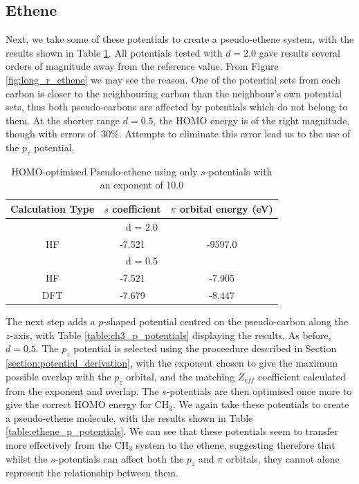 \documentclass[journal=jctcce,manuscript=article]{achemso}
\begin{document}
\subsection{Ethene}

Next, we take some of these potentials to create a pseudo-ethene system, with the results shown in Table \ref{table:ethene_s_pseudo}. All potentials tested with \(d = 2.0\) gave results several orders of magnitude away from the reference value. From Figure \ref{fig:long_r_ethene} we may see the reason. One of the potential sets from each carbon is closer to the neighbouring carbon than the neighbour's own potential sets, thus both pseudo-carbons are affected by potentials which do not belong to them. At the shorter range \(d = 0.5\), the HOMO energy is of the right magnitude, though with errors of \(~ 30\%\). Attempts to eliminate this error lead us to the use of the \(p_{z}\) potential. 

\begin{table}[ht]
\caption{HOMO-optimised Pseudo-ethene using only \(s\)-potentials with an exponent of 10.0}

\begin{tabular}{c c c}
\hline\hline
Calculation Type & \(s\) coefficient & \( \pi \) orbital energy (eV) \\
\hline
\multicolumn{3}{c}{d = 2.0} \\
\hline
HF & -7.521 & -9597.0 \\
\hline
\multicolumn{3}{c}{d = 0.5} \\
\hline
HF & -7.521 & -7.905 \\
DFT & -7.679 & -8.447 \\
\hline
\end{tabular}
\label{table:ethene_s_pseudo}
\end{table}

The next step adds a \(p\)-shaped potential centred on the pseudo-carbon along the \(z\)-axis, with Table \ref{table:ch3_p_potentials} displaying the results. As before, \(d = 0.5\). The \(p_{z}\) potential is selected using the proceedure described in Section \ref{section:potential_derivation}, with the exponent chosen to give the maximum possible overlap with the \(p_{z}\) orbital, and the matching \(Z_{eff}\) coefficient calculated from the exponent and overlap. The \(s\)-potentials are then optimised once more to give the correct HOMO energy for CH\(_{3}\). We again take these potentials to create a pseudo-ethene molecule, with the results shown in Table \ref{table:ethene_p_potentials}. We can see that these potentials seem to transfer more effectively from the CH\(_{3}\) system to the ethene, suggesting therefore that whilst the \(s\)-potentials can affect both the \(p_{z}\) and \(\pi\) orbitals, they cannot alone represent the relationship between them.
\end{document}
